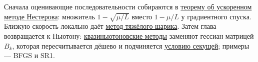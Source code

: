 Сначала оценивающие последовательности собираются в \hyperref[note:C038105E-BD42-44A8-9542-2DBE9FFAAA3F]{теорему об ускоренном методе Нестерова}: множитель $1 - \sqrt{\mu/L}$ вместо $1 - \mu/L$ у градиентного спуска. Близкую скорость локально даёт \hyperref[note:C6A43F85-13E0-46B3-96A8-BCB9F34ECD57]{метод тяжёлого шарика}. Затем глава возвращается к Ньютону: \hyperref[note:6BA18878-DE34-46A5-ABE2-EDA09CAE56A7]{квазиньютоновские методы} заменяют гессиан матрицей $B_k$, которая пересчитывается дёшево и подчиняется \hyperref[note:E976DE49-0091-45E1-B621-A236F8B87859]{условию секущей}; примеры --- BFGS и SR1.
